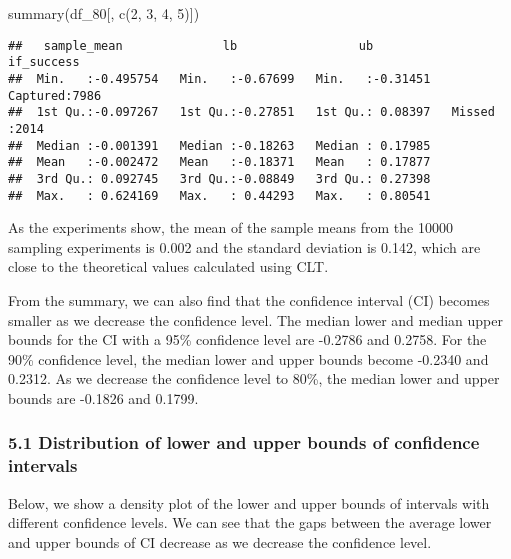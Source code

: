 \documentclass[
]{article}
\newenvironment{Shaded}{\begin{snugshade}}{\end{snugshade}}
\newcommand{\DecValTok}[1]{\textcolor[rgb]{0.00,0.00,0.81}{#1}}
\newcommand{\FunctionTok}[1]{\textcolor[rgb]{0.00,0.00,0.00}{#1}}
\newcommand{\NormalTok}[1]{#1}
\begin{document}
\begin{Shaded}
\begin{Highlighting}[]
\FunctionTok{summary}\NormalTok{(df\_80[, }\FunctionTok{c}\NormalTok{(}\DecValTok{2}\NormalTok{, }\DecValTok{3}\NormalTok{, }\DecValTok{4}\NormalTok{, }\DecValTok{5}\NormalTok{)])}
\end{Highlighting}
\end{Shaded}

\begin{verbatim}
##   sample_mean              lb                 ub              if_success  
##  Min.   :-0.495754   Min.   :-0.67699   Min.   :-0.31451   Captured:7986  
##  1st Qu.:-0.097267   1st Qu.:-0.27851   1st Qu.: 0.08397   Missed  :2014  
##  Median :-0.001391   Median :-0.18263   Median : 0.17985                  
##  Mean   :-0.002472   Mean   :-0.18371   Mean   : 0.17877                  
##  3rd Qu.: 0.092745   3rd Qu.:-0.08849   3rd Qu.: 0.27398                  
##  Max.   : 0.624169   Max.   : 0.44293   Max.   : 0.80541
\end{verbatim}

As the experiments show, the mean of the sample means from the 10000
sampling experiments is 0.002 and the standard deviation is 0.142, which
are close to the theoretical values calculated using CLT.

From the summary, we can also find that the confidence interval (CI)
becomes smaller as we decrease the confidence level. The median lower
and median upper bounds for the CI with a 95\% confidence level are
-0.2786 and 0.2758. For the 90\% confidence level, the median lower and
upper bounds become -0.2340 and 0.2312. As we decrease the confidence
level to 80\%, the median lower and upper bounds are -0.1826 and 0.1799.

\hypertarget{distribution-of-lower-and-upper-bounds-of-confidence-intervals}{%
\subsubsection{5.1 Distribution of lower and upper bounds of confidence
intervals}\label{distribution-of-lower-and-upper-bounds-of-confidence-intervals}}

Below, we show a density plot of the lower and upper bounds of intervals
with different confidence levels. We can see that the gaps between the
average lower and upper bounds of CI decrease as we decrease the
confidence level.
\end{document}
